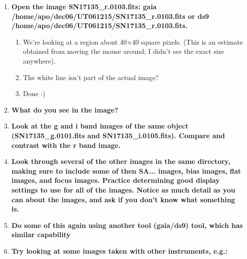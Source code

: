 \documentclass[12pt]{article}
\begin{document}
\begin{enumerate}[1.]
  \item \textbf{Open the image SN17135\_r.0103.fits: gaia
  /home/apo/dec06/UT061215/SN17135\_r.0103.fits or ds9
  /home/apo/dec06/UT061215/SN17135\_r.0103.fits.}
  \begin{enumerate}[1.]
    \item We're looking at a region about 40$\times$40 square pixels.
      (This is an estimate obtained from moving the mouse around;
      I didn't see the exact size anywhere).
    \item The white line isn't part of the actual image?
    \item Done :)  
  \end{enumerate}
  
  \item \textbf{What do you see in the image?}
  \item \textbf{Look at the g and i band images of the same object
  (SN17135\_g.0101.fits and SN17135\_i.0105.fits). Compare and contrast
  with the r band image.}
  \item \textbf{Look through several of the other images in the same
  directory, making sure to include some of then SA... images, bias
  images, flat images, and focus images. Practice determining good
  display settings to use for all of the images. Notice as much detail
  as you can about the images, and ask if you don't know what
  something is.}
  \item \textbf{Do some of this again using another tool (gaia/ds9) tool,
  which has similar capability}
  \item \textbf{Try looking at some images taken with other instruments, e.g.:}



\end{enumerate}
\end{document}
